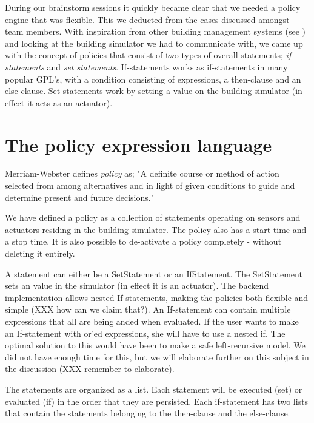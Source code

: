 During our brainstorm sessions it quickly became clear that we needed a policy engine that was flexible. This we deducted from the cases discussed amongst team members. With inspiration from other building management systems (see ) and looking at the building simulator we had to communicate with, we came up with the concept of policies that consist of two types of overall statements; \textit{if-statements} and \textit{set statements}. If-statements works as if-statements in many popular GPL's, with a condition consisting of expressions, a then-clause and an else-clause. Set statements work by setting a value on the building simulator (in effect it acts as an actuator).

\section{The policy expression language}
Merriam-Webster defines \textit{policy} as; "A definite course or method of action selected from among alternatives and in light of given conditions to guide and determine present and future decisions."

We have defined a policy as a collection of statements operating on sensors and actuators residing in the building simulator. The policy also has a start time and a stop time. It is also possible to de-activate a policy completely - without deleting it entirely.

A statement can either be a SetStatement or an IfStatement. The SetStatement sets an value in the simulator (in effect it is an actuator). The backend implementation allows nested If-statements, making the policies both flexible and simple (XXX how can we claim that?). An If-statement can contain multiple expressions that all are being anded when evaluated. If the user wants to make an If-statement with or'ed expressions, she will have to use a nested if. The optimal solution to this would have been to make a safe left-recursive model. We did not have enough time for this, but we will elaborate further on this subject in the discussion (XXX remember to elaborate). 

The statements are organized as a list. Each statement will be executed (set) or evaluated (if) in the order that they are persisted. Each if-statement has two lists that contain the statements belonging to the then-clause and the else-clause.

